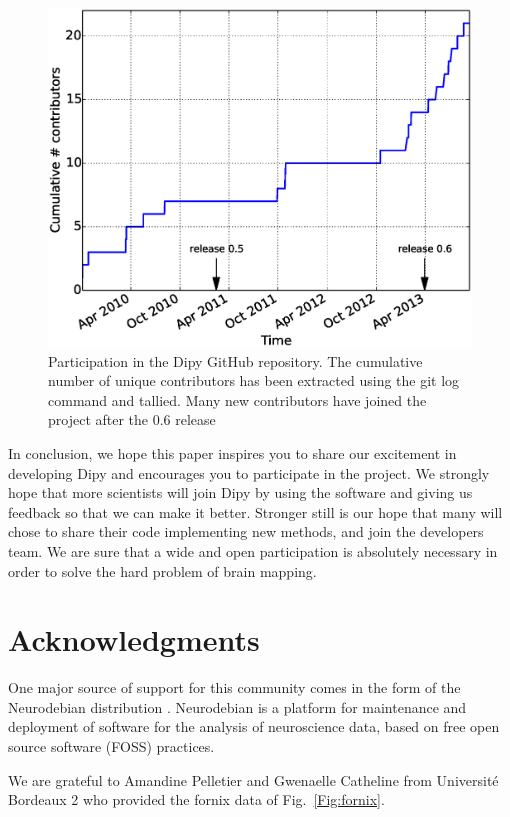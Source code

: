 \documentclass{bioinfo}
\begin{document}
\begin{figure}
\centering{}
\includegraphics[scale=0.37]{Figures/fig-gh.eps}
\caption{Participation in the Dipy GitHub repository. The cumulative number of
  unique contributors has been extracted using the git log command and tallied. Many
  new contributors have joined the project after the 0.6 release \label{Fig:gh_stats}}
\end{figure}

In conclusion, we hope this paper inspires you to share our excitement in developing Dipy and encourages
you to participate in the project. We strongly hope that more scientists will join
Dipy by using the software and giving us feedback so that we can make it better. Stronger still
is our hope that many will chose to share their code implementing new methods, and join the developers team. We are sure that
a wide and open participation is absolutely necessary in order to solve the hard problem of brain mapping.


\section*{Acknowledgments}
One major source of support for this community comes in the form of the Neurodebian
distribution \citep{Halchenko2012}. Neurodebian is a platform for maintenance
and deployment of software for the analysis of neuroscience data, based on free
open source software (FOSS) practices.

We are grateful to Amandine Pelletier and Gwenaelle Catheline from Universit\'{e} Bordeaux 2 who provided the fornix data of Fig.~\ref{Fig:fornix}.
\end{document}
